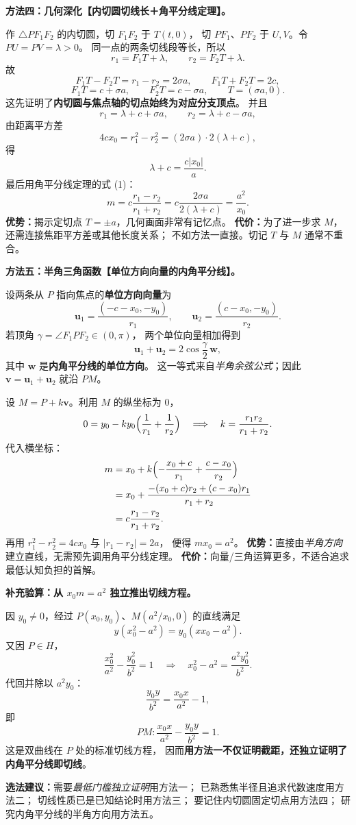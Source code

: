 \begin{proofbox}
\medskip
\textbf{方法四：几何深化【内切圆切线长＋角平分线定理】。}

作 $\triangle PF_1F_2$ 的内切圆，切 $F_1F_2$ 于 $T(t,0)$，
切 $PF_1$、$PF_2$ 于 $U,V$。令 $PU=PV=\lambda>0$。
同一点的两条切线段等长，所以
\[
r_1=F_1T+\lambda,\qquad
r_2=F_2T+\lambda.
\]
故
\[
F_1T-F_2T=r_1-r_2=2\sigma a,
\qquad F_1T+F_2T=2c,
\]
\[
F_1T=c+\sigma a,\qquad
F_2T=c-\sigma a,
\qquad\boxed{T=(\sigma a,0)}.
\]
这先证明了\textbf{内切圆与焦点轴的切点始终为对应分支顶点}。
并且
\[
r_1=\lambda+c+\sigma a,\qquad
r_2=\lambda+c-\sigma a,
\]
由距离平方差
\[
4cx_0=r_1^2-r_2^2
=(2\sigma a)\cdot2(\lambda+c),
\]
得
\[
\lambda+c=\frac{c|x_0|}{a}.
\]
最后用角平分线定理的式 (1)：
\[
m=c\frac{r_1-r_2}{r_1+r_2}
=c\frac{2\sigma a}{2(\lambda+c)}
=\boxed{\frac{a^2}{x_0}}.
\]
\textbf{优势：}揭示定切点 $T=\pm a$，几何画面非常有记忆点。
\textbf{代价：}为了进一步求 $M$，还需连接焦距平方差或其他长度关系；
不如方法一直接。切记 $T$ 与 $M$ 通常不重合。

\medskip
\textbf{方法五：半角三角函数【单位方向向量的内角平分线】。}

设两条从 $P$ 指向焦点的\textbf{单位方向向量}为
\[
\boldsymbol{u}_1=\frac{(-c-x_0,-y_0)}{r_1},
\qquad
\boldsymbol{u}_2=\frac{(c-x_0,-y_0)}{r_2}.
\]
若顶角 $\gamma=\angle F_1PF_2\in(0,\pi)$，
两个单位向量相加得到
\[
\boldsymbol{u}_1+\boldsymbol{u}_2
=2\cos\frac{\gamma}{2}\,\boldsymbol{w},
\]
其中 $\boldsymbol{w}$ 是\textbf{内角平分线的单位方向}。
这一等式来自\emph{半角余弦公式}；因此
$\boldsymbol{v}=\boldsymbol{u}_1+\boldsymbol{u}_2$ 就沿 $PM$。

设 $M=P+k\boldsymbol v$。利用 $M$ 的纵坐标为 $0$，
\[
0=y_0-k y_0\Bigl(\frac1{r_1}+\frac1{r_2}\Bigr)
\quad\Longrightarrow\quad
k=\frac{r_1r_2}{r_1+r_2}.
\]
代入横坐标：
\[
\begin{aligned}
m
&=x_0+k\Bigl(-\frac{x_0+c}{r_1}+\frac{c-x_0}{r_2}\Bigr)\\
&=x_0+\frac{-(x_0+c)r_2+(c-x_0)r_1}{r_1+r_2}\\
&=c\frac{r_1-r_2}{r_1+r_2}.
\end{aligned}
\]
再用 $r_1^2-r_2^2=4cx_0$ 与 $|r_1-r_2|=2a$，
便得 $mx_0=a^2$。
\textbf{优势：}直接由\emph{半角方向}建立直线，无需预先调用角平分线定理。
\textbf{代价：}向量/三角运算更多，不适合追求最低认知负担的首解。

\medskip
\textbf{补充验算：从 $x_0m=a^2$ 独立推出切线方程。}

因 $y_0\ne0$，经过 $P(x_0,y_0)$、$M(a^2/x_0,0)$ 的直线满足
\[
y(x_0^2-a^2)=y_0(xx_0-a^2).
\]
又因 $P\in H$，
\[
\frac{x_0^2}{a^2}-\frac{y_0^2}{b^2}=1
\quad\Longrightarrow\quad
x_0^2-a^2=\frac{a^2y_0^2}{b^2}.
\]
代回并除以 $a^2y_0$：
\[
\frac{y_0y}{b^2}=\frac{x_0x}{a^2}-1,
\]
即
\[
\boxed{PM:\frac{x_0x}{a^2}-\frac{y_0y}{b^2}=1}.
\]
这是双曲线在 $P$ 处的标准切线方程，
因而\textbf{用方法一不仅证明截距，还独立证明了内角平分线即切线}。

\medskip
\textbf{选法建议：}需要\emph{最低门槛独立证明}用方法一；
已熟悉焦半径且追求代数速度用方法二；
切线性质已是已知结论时用方法三；
要记住内切圆固定切点用方法四；
研究内角平分线的半角方向用方法五。
\end{proofbox}
